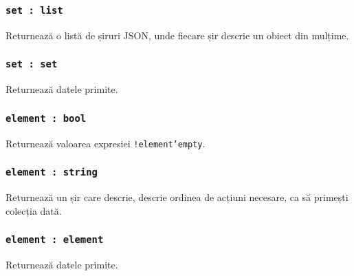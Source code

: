 \subsubsection{\texttt{set : list}}

Returnează o listă de șiruri JSON, unde fiecare șir descrie un obiect din mulțime.

\subsubsection{\texttt{set : set}}

Returnează datele primite.

\subsubsection{\texttt{element : bool}}

Returnează valoarea expresiei \texttt{!element'empty}.

\subsubsection{\texttt{element : string}}

Returnează un șir care descrie, descrie ordinea de acțiuni necesare, ca să primești colecția dată.

\subsubsection{\texttt{element : element}}

Returnează datele primite.
